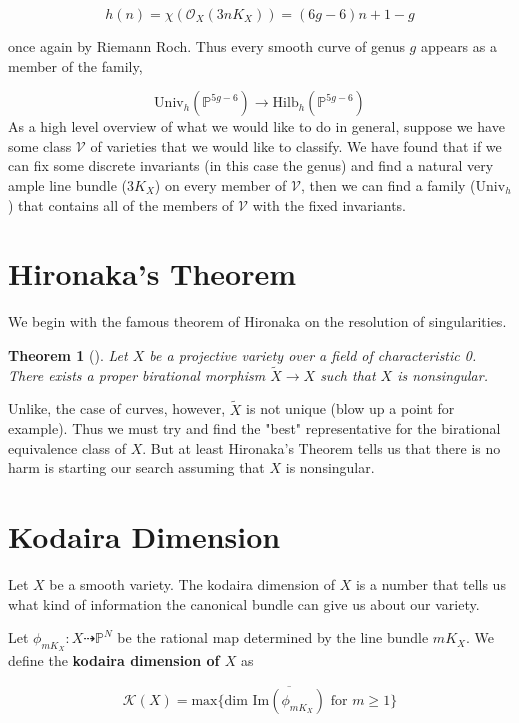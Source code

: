 \documentclass[a4paper]{article}
\newcommand{\Oc}{\mathcal{O}}
\newtheorem{theorem}{Theorem}
\numberwithin{theorem}{section}
\begin{document}
$$ h(n) =  \chi(\Oc_X(3nK_X)) = (6g-6)n + 1 - g$$

once again by Riemann Roch. Thus every smooth curve of genus $g$ appears as a member of the family,

$$ \text{Univ}_h(\mathbb{P}^{5g-6}) \rightarrow \text{Hilb}_h(\mathbb{P}^{5g-6}) $$As a high level overview of what we would like to do in general, suppose we have some class $\mathcal{V}$ of varieties that we would like to classify. We have found that if we can fix some discrete invariants (in this case the genus) and find a natural very ample line bundle (3$K_X$) on every member of $\mathcal{V}$, then we can find a family ($\text{Univ}_h$) that contains all of the members of $\mathcal{V}$ with the fixed invariants.

\section{Hironaka's Theorem}

We begin with the famous theorem of Hironaka on the resolution of singularities.

\begin{theorem}[\cite{Hironaka64}]

Let $X$ be a projective variety over a field of characteristic 0. There exists a proper birational morphism $\tilde{X} \rightarrow X$ such that $X$ is nonsingular.
\end{theorem}

Unlike, the case of curves, however, $\tilde{X}$ is not unique (blow up a point for example). Thus we must try and find the "best" representative for the birational equivalence class of $X$. But at least Hironaka's Theorem tells us that there is no harm is starting our search assuming that $X$ is nonsingular.


\section{Kodaira Dimension} \label{kodaira}
Let $X$ be a smooth variety. The kodaira dimension of $X$ is a number that tells us what kind of information the canonical bundle can give us about our variety.

Let $\phi_{mK_X}: X \dashrightarrow \mathbb{P}^N$ be the rational map determined by the line bundle $mK_X$. We define the \textbf{kodaira dimension of $X$} as

$$ \mathcal{K}(X) = \text{max}\{\text{dim } \overline{\text{Im}(\phi_{mK_X})} \text{ for } m \geq 1\} $$
\end{document}
